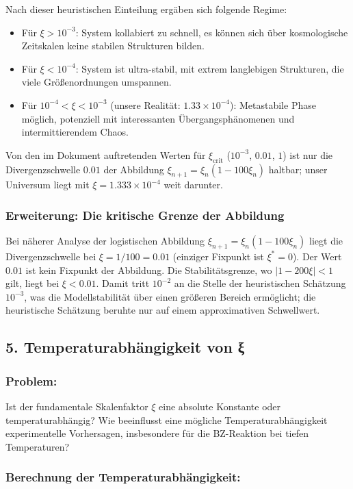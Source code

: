 Nach dieser heuristischen Einteilung ergäben sich folgende Regime:
\begin{itemize}
	\item Für $\xi > 10^{-3}$: System kollabiert zu schnell, es können sich über kosmologische Zeitskalen keine stabilen Strukturen bilden.
	\item Für $\xi < 10^{-4}$: System ist ultra-stabil, mit extrem langlebigen Strukturen, die viele Größenordnungen umspannen.
	\item Für $10^{-4} < \xi < 10^{-3}$ (unsere Realität: $1.33\times10^{-4}$): Metastabile Phase möglich, potenziell mit interessanten Übergangsphänomenen und intermittierendem Chaos.
\end{itemize}
Von den im Dokument auftretenden Werten für $\xi_{\text{crit}}$ ($10^{-3}$, $0.01$, $1$) ist nur die Divergenzschwelle $0.01$ der Abbildung $\xi_{n+1} = \xi_n(1-100\xi_n)$ haltbar; unser Universum liegt mit $\xi = 1.333\times10^{-4}$ weit darunter.

\subsubsection*{Erweiterung: Die kritische Grenze der Abbildung}
Bei näherer Analyse der logistischen Abbildung $\xi_{n+1} = \xi_n (1 - 100 \xi_n)$ liegt die Divergenzschwelle bei $\xi = 1/100 = 0.01$ (einziger Fixpunkt ist $\xi^* = 0$). Der Wert $0.01$ ist kein Fixpunkt der Abbildung. Die Stabilitätsgrenze, wo $| 1 - 200 \xi| < 1 $ gilt, liegt bei $\xi < 0.01$. Damit tritt $10^{-2}$ an die Stelle der heuristischen Schätzung $10^{-3}$, was die Modellstabilität über einen größeren Bereich ermöglicht; die heuristische Schätzung beruhte nur auf einem approximativen Schwellwert.

\subsection*{5. Temperaturabhängigkeit von ξ}

\subsubsection*{Problem:}
Ist der fundamentale Skalenfaktor $\xi$ eine absolute Konstante oder temperaturabhängig? Wie beeinflusst eine mögliche Temperaturabhängigkeit experimentelle Vorhersagen, insbesondere für die BZ-Reaktion bei tiefen Temperaturen?

\subsubsection*{Berechnung der Temperaturabhängigkeit:}

